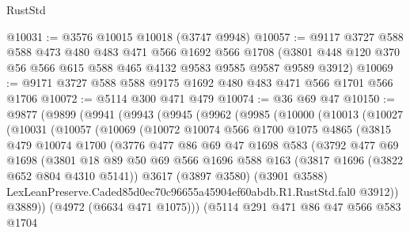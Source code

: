 \begin{lexlean}{RustStd}
\begin{coremodule}
@10031 := @3576 @10015 @10018 (@3747 @9948)
@10057 := @9117
    @3727
    @588
    @588
    @473
    @480
    @483
    @471
    @566
    @1692
    @566
    @1708
    (@3801 @448 @120 @370 @56 @566 @615 @588 @465 @4132 @9583 @9585 @9587 @9589 @3912)
@10069 := @9171 @3727 @588 @588 @9175 @1692 @480 @483 @471 @566 @1701 @566 @1706
@10072 := @5114 @300 @471 @479
@10074 := @36 @69 @47
@10150 := @9877
    (@9899
      (@9941
        (@9943
          (@9945
            (@9962
              (@9985
                (@10000
                  (@10013
                    (@10027
                      (@10031
                        (@10057
                          (@10069
                            (@10072
                              @10074
                              @566
                              @1700
                              @1075
                              @4865
                              (@3815
                                @479
                                @10074
                                @1700
                                (@3776
                                  @477
                                  @86
                                  @69
                                  @47
                                  @1698
                                  @583
                                  (@3792
                                    @477
                                    @69
                                    @1698
                                    (@3801
                                      @18
                                      @89
                                      @50
                                      @69
                                      @566
                                      @1696
                                      @588
                                      @163
                                      (@3817 @1696 (@3822 @652 @804 @4310 @5141))
                                      @3617
                                      (@3897 @3580)
                                      (@3901 @3588)
                                      LexLeanPreserve.Caded85d0ec70c96655a45904ef60abdb.R1.RustStd.fal0
                                      @3912))
                                  @3889))
                              (@4972 (@6634 @471 @1075)))
                            (@5114
                              @291
                              @471
                              @86
                              @47
                              @566
                              @583
                              @1704

\end{coremodule}
\end{lexlean}
